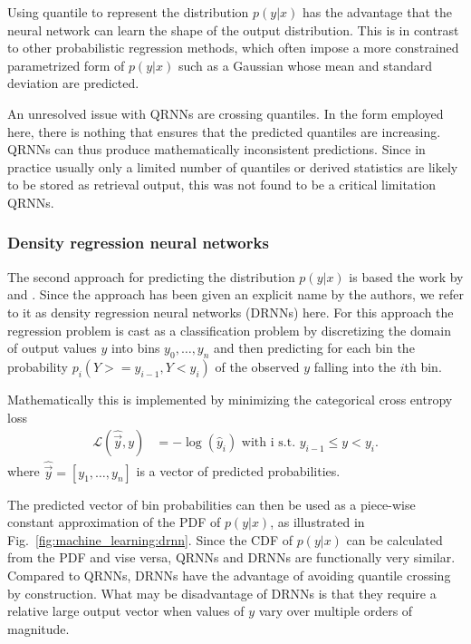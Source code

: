 \begin{description}
Using quantile to represent the distribution $p(y|x)$ has the advantage that the
neural network can learn the shape of the output distribution. This is in
contrast to other probabilistic regression methods, which often impose a more
constrained parametrized form of $p(y|x)$ such as a Gaussian whose mean and
standard deviation are predicted.

An unresolved issue with QRNNs are crossing quantiles. In the form employed
here, there is nothing that ensures that the predicted quantiles are increasing.
QRNNs can thus produce mathematically inconsistent predictions. 
Since in practice usually only a limited number of quantiles or derived statistics
are likely to be stored as retrieval output, this was not found to be a critical
limitation QRNNs.


\subsubsection{Density regression neural networks}

The second approach for predicting the distribution $p(y|x)$ is based the work
by \citet{oord16} and \citet{sonderby20}. Since the approach has been given an
explicit name by the authors, we refer to it as density regression neural
networks (DRNNs) here. For this approach the regression problem is cast as a
classification problem by discretizing the domain of output values $y$ into bins
$y_0, \ldots, y_n$ and then predicting for each bin the probability
$p_i(Y >= y_{i - 1}, Y < y_i)$ of the observed $y$ falling into the $i$th bin.


Mathematically this is implemented by minimizing the
categorical cross entropy loss
\begin{align}
  \mathcal{L}(\hat{\vec{y}}, y) &=  -\log(\hat{y}_i) \text { with i s.t. } y_{i - 1} \leq y < y_i.
\end{align}
where $\hat{\vec{y}} = [y_1, \ldots, y_n]$ is a vector of predicted probabilities.

The predicted vector of bin probabilities can then be used as a piece-wise
constant approximation of the PDF of $p(y | x)$, as illustrated in
Fig.~\ref{fig:machine_learning:drnn}. Since the CDF of $p(y | x)$ can be
calculated from the PDF and vise versa, QRNNs and DRNNs are functionally very
similar. Compared to QRNNs, DRNNs have the advantage of avoiding quantile
crossing by construction. What may be disadvantage of DRNNs is that they require
a relative large output vector when values of $y$ vary over multiple orders of
magnitude.


\end{description}
